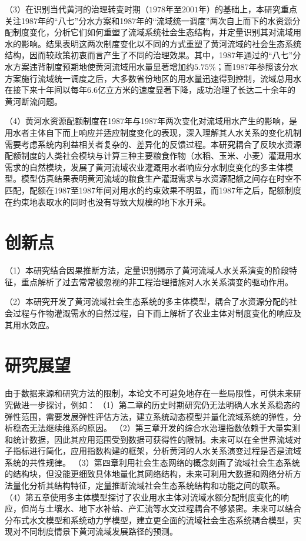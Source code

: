 （3）在识别当代黄河的治理转变时期（$1978$年至$2001$年）的基础上，本研究重点关注1987年的``八七''分水方案和1987年的“流域统一调度”两次自上而下的水资源分配制度变化，分析它们如何重塑了流域系统社会\textendash{}生态结构，并定量识别其对流域用水的影响。结果表明这两次制度变化以不同的方式重塑了黄河流域的社会\textendash{}生态系统结构，因而较政策初衷而言产生了不同的治理效果。其中，1987年通过的``八七''分水方案违背制度预期地使黄河流域用水量显著增加约$5.75\%$；而1987年参照该分水方案施行流域统一调度之后，大多数省份地区的用水量迅速得到控制，流域总用水在接下来十年间以每年$6.6$亿立方米的速度显著下降，成功治理了长达二十余年的黄河断流问题。

（4）黄河水资源配额制度在1987年与1987年两次变化对流域用水产生的影响，是用水者主体自下而上响应并适应制度变化的表现，深入理解其人\textendash{}水关系的变化机制需要考虑系统内利益相关者复杂的、差异化的反馈过程。本研究耦合了反映水资源配额制度的人类社会模块与计算三种主要粮食作物（水稻、玉米、小麦）灌溉用水需求的自然模块，发展了黄河流域农业灌溉用水者响应分水制度变化的多主体模型。模型仿真结果表明黄河流域的粮食生产灌溉需求与水资源配额之间存在时空不匹配，配额在1987至1987年间对用水的约束效果不明显，而1987年之后，配额制度在约束地表取水的同时也没有导致大规模的地下水开采。

\section{创新点}

（1）本研究结合因果推断方法，定量识别揭示了黄河流域人\textendash{}水关系演变的阶段特征，重点解析了过去常常被忽视的非工程治理措施对人\textendash{}水关系演变的驱动作用。

（2）本研究开发了黄河流域社会\textendash{}生态系统的多主体模型，耦合了水资源分配的社会过程与作物灌溉需水的自然过程，自下而上解析了农业主体对制度变化的响应及其用水效应。

\section{研究展望}

由于数据来源和研究方法的限制，本论文不可避免地存在一些局限性，可供未来研究做进一步探讨，例如：
（1）第二章的历史时期研究仍无法明确人\textendash{}水关系稳态的弹性范围，需要发展弹性评估方法，建立系统动态模型并量化流域系统的弹性，分析稳态无法继续维系的原因。
（2）第三章开发的综合水治理指数依赖于大量实测和统计数据，因此其应用范围受到数据可获得性的限制。未来可以在全世界流域对子指标进行简化，应用指数构建的框架，分析黄河的人\textendash{}水关系演变过程是否是流域系统的共性规律。
（3）第四章利用社会\textendash{}生态网络的概念刻画了流域社会\textendash{}生态系统的结构块，但没能更细致具体地量化其网络结构，未来可利用大数据和网络分析方法量化分析其结构特征，定量推断流域社会\textendash{}生态系统结构和功能之间的联系。
（4）第五章使用多主体模型探讨了农业用水主体对流域水额分配制度变化的响应，但尚与土壤水、地下水补给、产汇流等水文过程耦合不够紧密。未来可以结合分布式水文模型和系统动力学模型，建立更全面的流域社会\textendash{}生态系统耦合模型，实现对不同制度情景下黄河流域发展路径的预测。

